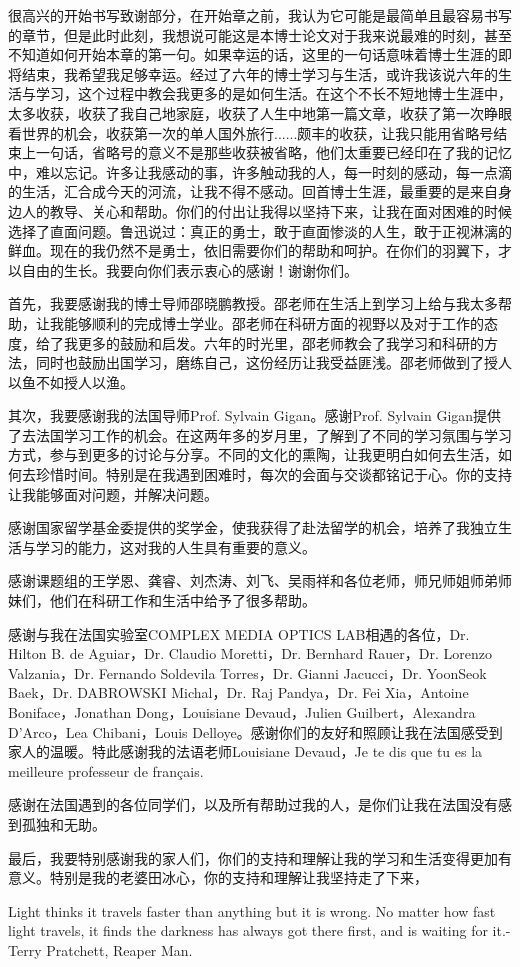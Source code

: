 
\begin{thanks}

很高兴的开始书写致谢部分，在开始章之前，我认为它可能是最简单且最容易书写的章节，但是此时此刻，我想说可能这是本博士论文对于我来说最难的时刻，甚至不知道如何开始本章的第一句。如果幸运的话，这里的一句话意味着博士生涯的即将结束，我希望我足够幸运。经过了六年的博士学习与生活，或许我该说六年的生活与学习，这个过程中教会我更多的是如何生活。在这个不长不短地博士生涯中，太多收获，收获了我自己地家庭，收获了人生中地第一篇文章，收获了第一次睁眼看世界的机会，收获第一次的单人国外旅行......颇丰的收获，让我只能用省略号结束上一句话，省略号的意义不是那些收获被省略，他们太重要已经印在了我的记忆中，难以忘记。许多让我感动的事，许多触动我的人，每一时刻的感动，每一点滴的生活，汇合成今天的河流，让我不得不感动。回首博士生涯，最重要的是来自身边人的教导、关心和帮助。你们的付出让我得以坚持下来，让我在面对困难的时候选择了直面问题。鲁迅说过：真正的勇士，敢于直面惨淡的人生，敢于正视淋漓的鲜血。现在的我仍然不是勇士，依旧需要你们的帮助和呵护。在你们的羽翼下，才以自由的生长。我要向你们表示衷心的感谢！谢谢你们。

首先，我要感谢我的博士导师邵晓鹏教授。邵老师在生活上到学习上给与我太多帮助，让我能够顺利的完成博士学业。邵老师在科研方面的视野以及对于工作的态度，给了我更多的鼓励和启发。六年的时光里，邵老师教会了我学习和科研的方法，同时也鼓励出国学习，磨练自己，这份经历让我受益匪浅。邵老师做到了授人以鱼不如授人以渔。

其次，我要感谢我的法国导师Prof. Sylvain Gigan。感谢Prof. Sylvain Gigan提供了去法国学习工作的机会。在这两年多的岁月里，了解到了不同的学习氛围与学习方式，参与到更多的讨论与分享。不同的文化的熏陶，让我更明白如何去生活，如何去珍惜时间。特别是在我遇到困难时，每次的会面与交谈都铭记于心。你的支持让我能够面对问题，并解决问题。

感谢国家留学基金委提供的奖学金，使我获得了赴法留学的机会，培养了我独立生活与学习的能力，这对我的人生具有重要的意义。

感谢课题组的王学恩、龚睿、刘杰涛、刘飞、吴雨祥和各位老师，师兄师姐师弟师妹们，他们在科研工作和生活中给予了很多帮助。

感谢与我在法国实验室COMPLEX MEDIA OPTICS LAB相遇的各位，Dr. Hilton B. de Aguiar，Dr. Claudio Moretti，Dr. Bernhard Rauer，Dr. Lorenzo Valzania，Dr. Fernando Soldevila Torres，Dr. Gianni Jacucci，Dr. YoonSeok Baek，Dr. DABROWSKI Michal，Dr. Raj Pandya，Dr. Fei Xia，Antoine Boniface，Jonathan Dong，Louisiane Devaud，Julien Guilbert，Alexandra D’Arco，Lea Chibani，Louis Delloye。感谢你们的友好和照顾让我在法国感受到家人的温暖。特此感谢我的法语老师Louisiane Devaud，Je te dis que tu es la meilleure professeur de français.

感谢在法国遇到的各位同学们，以及所有帮助过我的人，是你们让我在法国没有感到孤独和无助。

最后，我要特别感谢我的家人们，你们的支持和理解让我的学习和生活变得更加有意义。特别是我的老婆田冰心，你的支持和理解让我坚持走了下来，

Light thinks it travels faster than anything but it is wrong. No matter how fast light travels, it finds the darkness has always got there first, and is waiting for it.-Terry Pratchett, Reaper Man.
\end{thanks}
